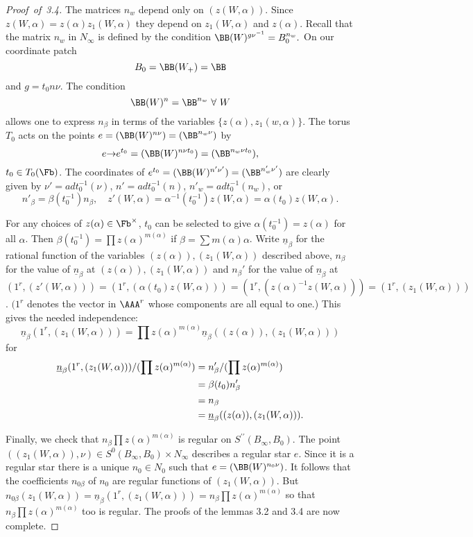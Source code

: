 \documentclass{memo-l}
\theoremstyle{definition}
\theoremstyle{remark}
\numberwithin{section}{chapter}
\numberwithin{equation}{chapter}
\begin{document}
\begin{proof}[Proof\ of\ 3.4]    The matrices $n_{w}$ depend only on $(z(W,{\alpha}))$.
 Since $z(W,{\alpha}) = z({\alpha})z_{1}(W,{\alpha})$ they depend on
$z_1(W,{\alpha})$ and $z({\alpha})$.
 Recall that the matrix $n_{w}$ in $N_{{\infty}}$ is defined by the condition
${\BB}(W)^{g\nu^{-1}} = B_{0}^{n_w}.$
On our
coordinate patch $$B_{0} = {\BB}(W_{+})={\BB}$$ and $g = t_{0}n{\nu}$.
 The condition $${\BB}(W)^n  =
{\BB}^{n_w} \ \forall \ W$$ allows one to
express $n_{{\beta}}$ in terms of the variables
$\{z({\alpha}),z_{1}(w,\alpha)\}$.   The torus $T_{0}$ acts on the points
$e = ({\BB}(W)^{n\nu}) =
({\BB}^{n_w\nu})$ by $$e {\to} e^{t_0}  = ({\BB}(W)^{n\nu t_0}) =
({\BB}^{n_w\nu t_0}),$$ $t_{0} \in T_{0}(\Fb)$.
The coordinates of $e^{t_0}  = ({\BB}(W)^{n'{\nu}'}) =
({\BB}^{n_{w}'{\nu}'})$ are clearly given by ${\nu}' =
adt_0^{-1}({\nu})$, $n' = adt_0^{-1}(n)$, $n'_{w} =
adt_0^{-1}(n_{w})$, or $$n'_{{\beta}} = {\beta}(t_0^{-1})n_{{\beta}},\quad
z'(W,{\alpha}) = {\alpha}^{-1}(t_0^{-1})z(W,{\alpha}) =
{\alpha}(t_0)z(W,{\alpha}).$$

   For any choices of $z({\alpha}) \in \Fb^{\times}$, $t_0$ can be selected
to give ${\alpha}(t_0^{-1}) = z({\alpha})$ for all ${\alpha}$.
 Then ${\beta}(t_0^{-1}) = \prod z({\alpha})^{m({\alpha})}$  if ${\beta} =
\sum m({\alpha}){\alpha}$.
 Write $\underline{n}_{{\beta}}$ for the rational function of the variables
$(z({\alpha})),(z_1(W,{\alpha}))$ described above, $n_{{\beta}}$ for the
value of $\underline{n}_{{\beta}}$ at $(z({\alpha})),(z_{1}(W,{\alpha}))$ and
$n_{{\beta}}'$ for the value of $\underline{n} _{{\beta}}$ at
$(1^r,(z'(W,{\alpha}))) =
(1^r,({\alpha}(t_{0})z(W,{\alpha}))) = (1^r,
(z({\alpha})^{-1}z(W,{\alpha}))) = (1^r,(z_{1}(W,{\alpha})))$.
 $(1^r$ denotes the vector in ${\AAA}^r$ whose components
are all equal to one.)  This gives the needed independence:
$$
\underline{n}_{{\beta}}(1^r,(z_{1}(W,{\alpha}))) =
\prod z({\alpha})^{m({\alpha})}\underline{n}_{{\beta}}((z({\alpha})),
(z_{1}(W,{\alpha})))
$$
for
$$
\aligned
\underline{n}_{{\beta}}(1^r,(z_{1}(W,{\alpha})))/(\prod
z({\alpha})^{m({\alpha})}) &= n'_{{\beta}}/(\prod z({\alpha})^{m({\alpha})}) \\
&= {\beta}(t_0)n'_\beta \\
&= n_\beta \\
&= \underline{n}_{{\beta}}((z({\alpha})),(z_{1}(W,{\alpha}))).
\endaligned
$$


Finally, we check that $n_{{\beta}} \prod z({\alpha})^{m({\alpha})}$
is regular on $S^{\prime\prime}(B_{{\infty}},B_{0})$.
The point
\newline
$((z_{1}(W,{\alpha})),{\nu}) \in S^{0}(B_{{\infty}},B_{0})
\times N_{{\infty}}$ describes a regular star $e$.
 Since it is a regular star there is a unique $n_0 \in N_{0}$ such that
$e = ({\BB}(W)^{n_0\nu})$.
 It follows that the coefficients $n_{0\beta}$ of $n_0$ are regular
functions of $(z_{1}(W,{\alpha}))$.
 But $n_{0\beta}(z_{1}(W,{\alpha})) = \underline{n}_{{\beta}}(1^r,
(z_{1}(W,{\alpha}))) = n_{{\beta}} \prod z({\alpha})^{m({\alpha})}$
so that $n_{{\beta}} \prod z({\alpha})^{m({\alpha})}$ too is regular.
 The proofs of the lemmas 3.2 and 3.4 are now complete.
 \end{proof}
\end{document}
